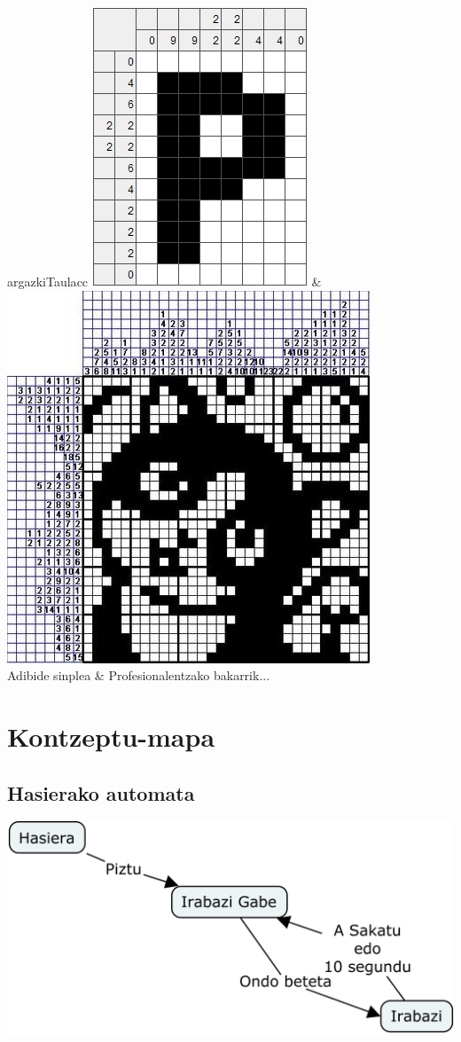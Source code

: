 \documentclass[dvipsnames]{AritzhClass}
\begin{document}
\begin{taula}{}{argazkiTaula}{cc}
\includegraphics[scale=0.75]{nonograma1} & \includegraphics[scale=0.75]{nonograma2} \\
Adibide sinplea & Profesionalentzako bakarrik...
\end{taula}

\section{Kontzeptu-mapa}
\subsection{Hasierako automata}
\begin{center}
\includegraphics[scale=0.4]{Nonograma_Mapa}
\end{center}
\end{document}
